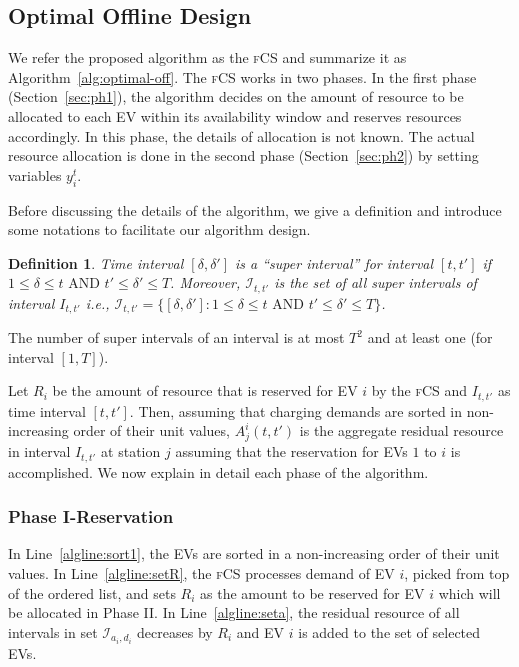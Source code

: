 \documentclass[journal]{IEEEtran}
\newcommand{\bt}[1]{{\color{blue}#1}}%
\newcommand{\revv}[1]{{\color{black}#1}}%
\newcommand{\bt}[1]{#1}
\newcommand{\fcs}{\textsc{fCS}\xspace}
\newtheorem{defi}{Definition}
\begin{document}
\revv{
\subsection{Optimal Offline Design}
\label{sec:fopt}				
We refer the proposed algorithm as the \fcs and summarize it as Algorithm~\ref{alg:optimal-off}.
The \fcs works in two phases. In the first phase (Section~\ref{sec:ph1}), the algorithm decides on the amount of resource to be allocated to each EV within its availability window and reserves resources accordingly. In this phase, the details of allocation is not known. The actual resource allocation is done in the second phase (Section~\ref{sec:ph2}) by setting variables $y_i^t$.

Before discussing the details of the algorithm, we give \bt{a definition} and introduce some notations to facilitate our algorithm design.

\begin{defi}
	Time interval $[\delta,\delta']$ is a ``super interval'' for interval $[t,t']$ if $1\leq \delta\leq t \text{~AND~} t' \leq \delta'\leq T$.
	Moreover, $\mathcal{I}_{t,t'}$ is the set of all super intervals of interval $I_{t,t'}$ i.e., ${\mathcal{I}_{t,t'}=\{[\delta,\delta']: 1\leq \delta\leq t \text{~AND~} t'\leq \delta'\leq T\}}$.
\end{defi}

The number of super intervals of an interval is at most $T^2$ and at least one (for interval $[1,T]$). 

Let $R_i$ be the amount of resource that is reserved for EV $i$ by the \fcs and $I_{t,t'}$ as time interval $[t,t']$.
Then, assuming that charging demands are sorted in non-increasing order of their unit values, $A^i_j(t,t')$ is the aggregate residual resource in interval $I_{t,t'}$ at station $j$ assuming that the reservation for EVs $1$ to $i$ is accomplished. We now explain in detail each phase of the algorithm. 


\subsubsection{Phase I-Reservation\label{sec:ph1}} In Line~\ref{algline:sort1}, the EVs are sorted in a non-increasing order of their unit values.  
In Line~\ref{algline:setR}, the \fcs processes demand of EV $i$, picked from top of the ordered list, and sets $R_i$ as the amount to be reserved for EV $i$ which will be allocated in Phase II. In Line~\ref{algline:seta}, the residual resource of all intervals in set $\mathcal{I}_{a_i,d_i}$ decreases by $R_i$ and EV $i$ is added to the set of selected EVs.


}
\end{document}

